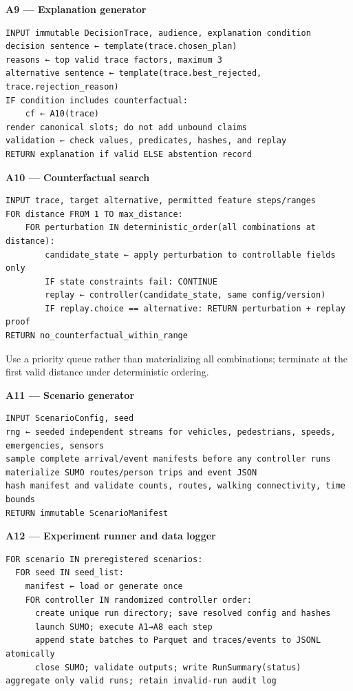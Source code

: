 \documentclass[
  english,
  11pt,
  a4paper,
]{article}
\begin{document}
\textbf{A9 --- Explanation generator}

\begin{verbatim}
INPUT immutable DecisionTrace, audience, explanation condition
decision sentence ← template(trace.chosen_plan)
reasons ← top valid trace factors, maximum 3
alternative sentence ← template(trace.best_rejected, trace.rejection_reason)
IF condition includes counterfactual:
    cf ← A10(trace)
render canonical slots; do not add unbound claims
validation ← check values, predicates, hashes, and replay
RETURN explanation if valid ELSE abstention record
\end{verbatim}

\textbf{A10 --- Counterfactual search}

\begin{verbatim}
INPUT trace, target alternative, permitted feature steps/ranges
FOR distance FROM 1 TO max_distance:
    FOR perturbation IN deterministic_order(all combinations at distance):
        candidate_state ← apply perturbation to controllable fields only
        IF state constraints fail: CONTINUE
        replay ← controller(candidate_state, same config/version)
        IF replay.choice == alternative: RETURN perturbation + replay proof
RETURN no_counterfactual_within_range
\end{verbatim}

Use a priority queue rather than materializing all combinations;
terminate at the first valid distance under deterministic ordering.

\textbf{A11 --- Scenario generator}

\begin{verbatim}
INPUT ScenarioConfig, seed
rng ← seeded independent streams for vehicles, pedestrians, speeds, emergencies, sensors
sample complete arrival/event manifests before any controller runs
materialize SUMO routes/person trips and event JSON
hash manifest and validate counts, routes, walking connectivity, time bounds
RETURN immutable ScenarioManifest
\end{verbatim}

\textbf{A12 --- Experiment runner and data logger}

\begin{verbatim}
FOR scenario IN preregistered scenarios:
  FOR seed IN seed_list:
    manifest ← load or generate once
    FOR controller IN randomized controller order:
      create unique run directory; save resolved config and hashes
      launch SUMO; execute A1→A8 each step
      append state batches to Parquet and traces/events to JSONL atomically
      close SUMO; validate outputs; write RunSummary(status)
aggregate only valid runs; retain invalid-run audit log
\end{verbatim}
\end{document}
